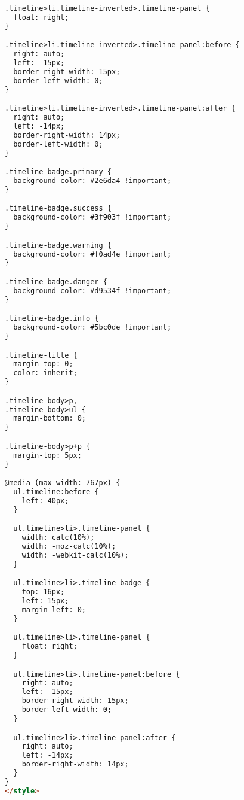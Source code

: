 \begin{lstlisting}[language=HTML]
.timeline>li.timeline-inverted>.timeline-panel {
  float: right;
}

.timeline>li.timeline-inverted>.timeline-panel:before {
  right: auto;
  left: -15px;
  border-right-width: 15px;
  border-left-width: 0;
}

.timeline>li.timeline-inverted>.timeline-panel:after {
  right: auto;
  left: -14px;
  border-right-width: 14px;
  border-left-width: 0;
}

.timeline-badge.primary {
  background-color: #2e6da4 !important;
}

.timeline-badge.success {
  background-color: #3f903f !important;
}

.timeline-badge.warning {
  background-color: #f0ad4e !important;
}

.timeline-badge.danger {
  background-color: #d9534f !important;
}

.timeline-badge.info {
  background-color: #5bc0de !important;
}

.timeline-title {
  margin-top: 0;
  color: inherit;
}

.timeline-body>p,
.timeline-body>ul {
  margin-bottom: 0;
}

.timeline-body>p+p {
  margin-top: 5px;
}

@media (max-width: 767px) {
  ul.timeline:before {
    left: 40px;
  }

  ul.timeline>li>.timeline-panel {
    width: calc(10%);
    width: -moz-calc(10%);
    width: -webkit-calc(10%);
  }

  ul.timeline>li>.timeline-badge {
    top: 16px;
    left: 15px;
    margin-left: 0;
  }

  ul.timeline>li>.timeline-panel {
    float: right;
  }

  ul.timeline>li>.timeline-panel:before {
    right: auto;
    left: -15px;
    border-right-width: 15px;
    border-left-width: 0;
  }

  ul.timeline>li>.timeline-panel:after {
    right: auto;
    left: -14px;
    border-right-width: 14px;
  }
}
</style>
\end{lstlisting}
\pagebreak

